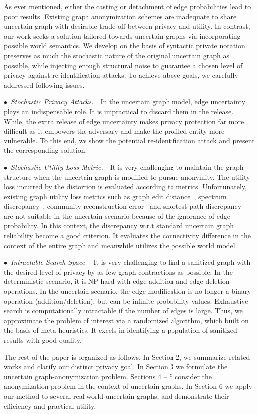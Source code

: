 As ever mentioned, either the casting or detachment of edge probabilities lead to poor results. Existing graph anonymization schemes are inadequate to share uncertain graph with desirable trade-off between privacy and utility. 
In contrast, our work seeks a solution tailored towards uncertain graphs via incorporating possible world semantics. We develop {\methodName} on the basis of syntactic private notation. {\methodName} preserves as much the stochastic nature of the original uncertain graph as possible, while injecting enough structural noise to guarantee a chosen level of privacy against re-identification attacks. To achieve above goals, we carefully addressed following issues. 

$\bullet$~\textup{\emph{Stochastic Privacy Attacks.}}~~In the uncertain graph model, edge uncertainty plays an indispensable role. It is impractical to discard them in the release.  
While, the extra release of edge uncertainty makes privacy protection far more difficult as it  empowers the adversary and make the profiled entity more vulnerable. To this end, we show the potential re-identification attack and present the corresponding solution. 

$\bullet$~\textup{\emph{Stochastic Utility Loss Metric.}}~~It is very challenging to maintain the graph structure when the uncertain graph is modified to pursue anonymity. The utility loss incurred by the distortion is evaluated according to metrics. Unfortunately, existing graph utility loss metrics such as graph edit distance~\cite{Liu_Towards_2008}, spectrum discrepancy~\cite{Ying_Randomizing_2008}, community reconstruction error~\cite{Wang2011} and shortest path discrepancy~\cite{Liu_Privacy_2009} are not suitable in the uncertain scenario because of the ignorance of edge probability. In this context, the discrepancy w.r.t standard uncertain graph reliability become a good criterion. It evaluates the connectivity difference in the context of the entire graph and meanwhile utilizes the possible world model. 

$\bullet$~\textup{\emph{Intractable Search Space.}}~~It is very challenging to find a sanitized graph with the desired level of privacy by as few graph contractions as possible. In the deterministic scenario, it is NP-hard with edge addition and edge deletion operations\cite{Hartung_Theory_2015}. In the uncertain scenario, the edge modification is no longer a binary operation (addition/deletion), but can be infinite probability values. Exhaustive search is computationally intractable if the number of edges is large. Thus, we approximate the problem of interest via a randomized algorithm, which built on the basis of meta-heuristics. It excels in identifying a population of sanitized results with good quality.

The rest of the paper is organized as follows. In Section 2, we summarize related works and clarify our distinct  privacy  goal. In Section 3 we formulate the uncertain graph-anonymization problem. Sections 4 – 5 consider the anonymization problem in the context of uncertain graphs.  In Section 6 we apply our method to several real-world uncertain graphs, and demonstrate their efficiency and practical utility. 
